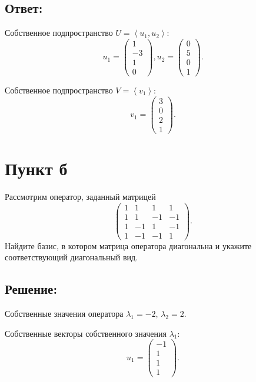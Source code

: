 \documentclass[12pt]{article}
\begin{document}
    \subsection*{Ответ:}
    Собственное подпространство $U = \left < u_1, u_2 \right >$:
    \[
        u_1 = \begin{pmatrix}
                  1 \\ -3 \\ 1 \\ 0
        \end{pmatrix},
        u_2 = \begin{pmatrix}
                  0 \\ 5 \\ 0 \\ 1
        \end{pmatrix}.
    \]

    Собственное подпространство $V = \left < v_1 \right >$:
    \[
        v_1 = \begin{pmatrix}
                  3 \\ 0 \\ 2 \\ 1
        \end{pmatrix} .
    \]

    \section*{Пункт б}
    Рассмотрим оператор, заданный матрицей
    \[
        \begin{pmatrix}
            1 & 1  & 1  & 1  \\
            1 & 1  & -1 & -1 \\
            1 & -1 & 1  & -1 \\
            1 & -1 & -1 & 1
        \end{pmatrix}.
    \]
    Найдите базис, в котором матрица оператора диагональна и укажите соответствующий диагональный вид.

    \subsection*{Решение:}
    Собственные значения оператора $\lambda_1 = -2$, $\lambda_2 = 2$.

    Собственные векторы собственного значения $\lambda_1$:
    \[
        u_1 = \begin{pmatrix}
                  -1 \\ 1 \\ 1 \\ 1
        \end{pmatrix}
        .
    \]
\end{document}
